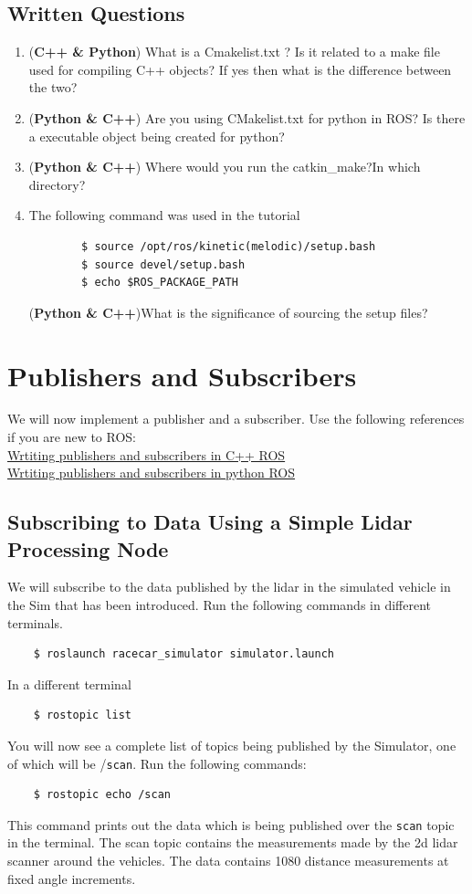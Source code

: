 \documentclass[letta4 paper]{article}
\numberwithin{equation}{section}
\newcommand{\0}{\mathbf{0}}
\begin{document}
	\subsection{Written Questions}
	\begin{enumerate}
		\item (\textbf{C++ \& Python}) What is a Cmakelist.txt ? Is it related to a make file used for compiling C++ objects? If yes then what is the difference between the two?
		\item (\textbf{Python \& C++}) Are you using CMakelist.txt for python in ROS? Is there a executable object being created for python? 
		\item (\textbf{Python \& C++}) Where would you run the catkin\_make?In which directory? 
		\item The following command was used in the tutorial
		\begin{lstlisting}
		$ source /opt/ros/kinetic(melodic)/setup.bash
		$ source devel/setup.bash
		$ echo $ROS_PACKAGE_PATH
		\end{lstlisting}{}
		(\textbf{Python \& C++})What is the significance of sourcing the setup files? 
		
	\end{enumerate}{}

	\section{Publishers and Subscribers}
	We will now implement a publisher and a subscriber. Use the following references if you are new to ROS: \\
	\href{http://wiki.ros.org/ROS/Tutorials/WritingPublisherSubscriber%28c%2B%2B%29}{Wrtiting publishers and subscribers in C++ ROS}\\
	\href{http://wiki.ros.org/ROS/Tutorials/WritingPublisherSubscriber%28python%29}{Wrtiting publishers and subscribers in python ROS}\\
			
	\subsection{Subscribing to Data Using a Simple Lidar Processing Node}
	We will subscribe to the data published by the lidar in the simulated vehicle in the Sim that has been introduced. Run the following commands in different terminals. 
	\begin{lstlisting}
	$ roslaunch racecar_simulator simulator.launch
	\end{lstlisting}{}
	In a different terminal
	\begin{lstlisting}
	$ rostopic list
	\end{lstlisting}{}
	You will now see a complete list of topics being published by the Simulator, one of which will be /\texttt{scan}. Run the following commands:
	\begin{lstlisting}
	$ rostopic echo /scan
	\end{lstlisting}{} 
	This command prints out the data which is being published over the \texttt{scan} topic in the terminal. The scan topic contains the measurements made by the 2d lidar scanner around the vehicles. The data contains 1080 distance measurements at fixed angle increments. 
\end{document}
